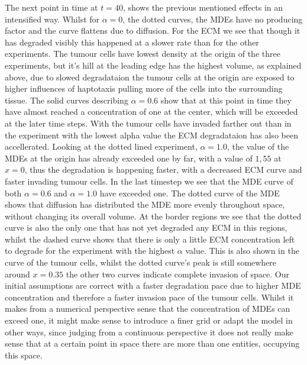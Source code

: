 The next point in time at $t=40$, shows the previous mentioned effects in an intensified way. Whilst for $\alpha=0$, the dotted curves, the MDEs have no producing factor and the curve flattens due to diffusion. For the ECM we see that though it has degraded visibly this happened at a slower rate than for the other experiments. The tumour cells have lowest density at the origin of the three experiments, but it's hill at the leading edge has the highest volume, as explained above, due to slowed degradataion the tumour cells at the origin are exposed to higher influences of haptotaxis pulling more of the cells into the surrounding tissue. 
The solid curves describing $\alpha = 0.6$ show that at this point in time they have almost reached a concentration of one at the center, which will be exceeded at the later time steps. With the tumour cells have invaded farther out than in the experiment with the lowest alpha value the ECM degradataion has also been accellerated.
Looking at the dotted lined experiment, $\alpha=1.0$, the value of the MDEs at the origin has already exceeded one by far, with a value of $1,55$ at $x=0$, thus the degradation is happening faster, with a decreased ECM curve and faster invading tumour cells.\newline 
In the last timestep we see that the MDE curve of both $\alpha=0.6$ and $\alpha=1.0$ have exceeded one. The dotted curve of the MDE shows that diffusion has distributed the MDE more evenly throughout space, without changing its overall volume. At the border regions we see that the dotted curve is also the only one that has not yet degraded any ECM in this regions, whilst the dashed curve shows that there is only a little ECM concentration left to degrade for the experiment with the highest $\alpha$ value. This is also shown in the curve of the tumour cells, whilst the dotted curve's peak is still somewhere around $x=0.35$ the other two curves indicate complete invasion of space. \newline
Our initial assumptions are correct with a faster degradation pace due to higher MDE concentration and therefore a faster invasion pace of the tumour cells. Whilst it makes from a numerical perspective sense that the concentration of MDEs can exceed one, it might make sense to introduce a finer grid or adapt the model in other ways, since judging from a continuous perspective it does not really make sense that at a certain point in space there are more than one entities, occupying this space. 

